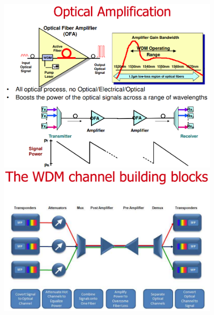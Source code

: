 \documentclass[8pt]{extarticle}
\begin{document}
\begin{figure}[H]
    \centering
    \begin{minipage}[c]{\linewidth}
        \begin{minipage}[l]{0.43\linewidth}
            \includegraphics[width=\linewidth]{images/FO17.png}
        \end{minipage}
        \hspace{0.04\linewidth}
        \begin{minipage}[l]{0.53\linewidth}
            \includegraphics[width=\linewidth]{images/FO18.png}
        \end{minipage}
    \end{minipage}
\end{figure}
\end{document}

